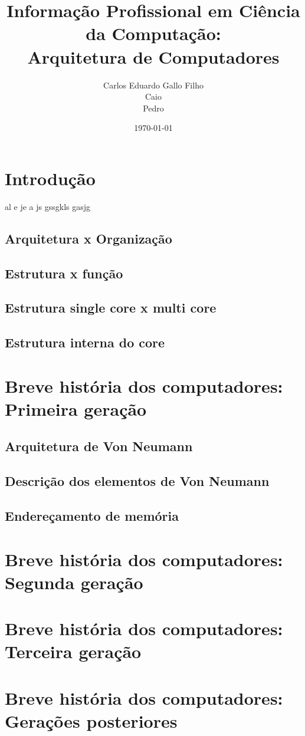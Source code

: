 \documentclass{article}
\title{Informação Profissional em Ciência da Computação:\\
	Arquitetura de Computadores}
\author{Carlos Eduardo Gallo Filho \\
	Caio \\
	Pedro}
\date{\today}
\begin{document}
\maketitle

\section{Introdução}
al e je a js gssgkls gasjg 

\subsection{Arquitetura x Organização}
\subsection{Estrutura x função}
\subsection{Estrutura single core x multi core}
\subsection{Estrutura interna do core}

\section{Breve história dos computadores: Primeira geração}

\subsection{Arquitetura de Von Neumann}
\subsection{Descrição dos elementos de Von Neumann}
\subsection{Endereçamento de memória}

\section{Breve história dos computadores: Segunda geração}
\section{Breve história dos computadores: Terceira geração}
\section{Breve história dos computadores: Gerações posteriores}
\end{document}
